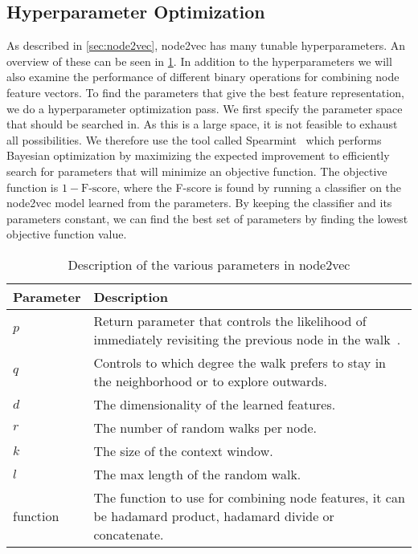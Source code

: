 \subsection{Hyperparameter Optimization}\label{sec:hyperopt}
As described in \cref{sec:node2vec}, node2vec has many tunable hyperparameters. An overview of these can be seen in \cref{tab:node2vecparams}. In addition to the hyperparameters we will also examine the performance of different binary operations for combining node feature vectors. To find the parameters that give the best feature representation, we do a hyperparameter optimization pass. We first specify the parameter space that should be searched in. As this is a large space, it is not feasible to exhaust all possibilities. We therefore use the tool called Spearmint~\cite{snoek2012practical} which performs Bayesian optimization by maximizing the expected improvement to efficiently search for parameters that will minimize an objective function. The objective function is $1 - \text{F-score}$, where the F-score is found by running a classifier on the node2vec model learned from the parameters. By keeping the classifier and its parameters constant, we can find the best set of parameters by finding the lowest objective function value.

\begin{table}[tbp]
\centering
\begin{tabular}{@{}lp{}@{}}
\toprule
\textbf{Parameter} & \textbf{Description} \\
\midrule
$p$          &   Return parameter that controls the likelihood of immediately revisiting the previous node in the walk~\cite{node2vec}.   \\
$q$          &   Controls to which degree the walk prefers to stay in the neighborhood or to explore outwards.   \\
$d$          &   The dimensionality of the learned features.   \\
$r$          &   The number of random walks per node.   \\
$k$          &   The size of the context window.   \\
$l$          &   The max length of the random walk.   \\
function     &   The function to use for combining node features, it can be hadamard product, hadamard divide or concatenate.   \\
\bottomrule
\end{tabular}
\caption[Description of parameters in node2vec]{Description of the various parameters in node2vec}%
\label{tab:node2vecparams}
\end{table}


